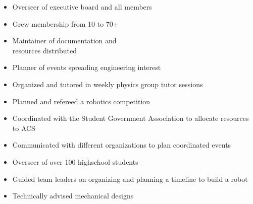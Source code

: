 \documentclass[10pt,a4paper,ragged2e,withhyper]{altacv}
\begin{document}
\begin{paracol}{2}
\begin{itemize}
	\item Overseer of executive board and all members
	\item Grew membership from 10 to 70+
	\item Maintainer of documentation and\\ resources distributed
	\item Planner of events spreading engineering interest
\end{itemize}

\divider
{}
	\begin{itemize}
		\item Organized and tutored in weekly physics group tutor sessions
		\item Planned and refereed a robotics competition
		
	\end{itemize}
\divider
{}
	\begin{itemize}
		\item Coordinated with the Student Government Association to allocate resources to ACS
		\item Communicated with different organizations to plan coordinated events
	\end{itemize}
\divider
{}
	\begin{itemize}
		\item Overseer of over 100 highschool students
		\item Guided team leaders on organizing and planning a timeline to build a robot
		\item Technically advised mechanical designs
	\end{itemize}





\\


\end{paracol}
\end{document}

